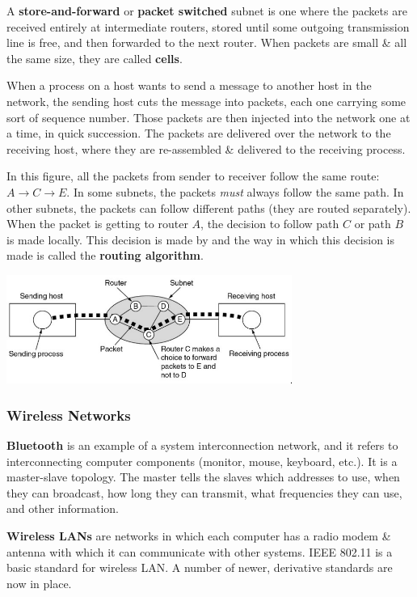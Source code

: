 \documentclass[11pt]{article}
\begin{document}
A \textbf{store-and-forward} or \textbf{packet switched} subnet is one where the packets are received entirely at intermediate 
routers, stored until some outgoing transmission line is free, and then forwarded to the next router. 
When packets are small \& all the same size, they are called \textbf{cells}. 

When a process on a host wants to send a message to another host in the network, the sending host cuts the message into packets,
each one carrying some sort of sequence number. 
Those packets are then injected into the network one at a time, in quick succession. 
The packets are delivered over the network to the receiving host, where they are re-assembled \& delivered to the receiving process. 

In this figure, all the packets from sender to receiver follow the same route: $ A \rightarrow C \rightarrow E $.
In some subnets, the packets \textit{must} always follow the same path. 
In other subnets, the packets can follow different paths (they are routed separately). 
When the packet is getting to router $A$, the decision to follow path $C$ or path $B$ is made locally. 
This decision is made by and the way in which this decision is made is called the \textbf{routing algorithm}.

\begin{center}
    \includegraphics[width=0.7\textwidth]{wan-diagram-2.png}
\end{center}

\subsubsection{Wireless Networks}
\textbf{Bluetooth} is an example of a system interconnection network, and it refers to interconnecting computer components 
(monitor, mouse, keyboard, etc.). 
It is a master-slave topology. 
The master tells the slaves which addresses to use, when they can broadcast, how long they can transmit, what frequencies they 
can use, and other information.

\textbf{Wireless LANs} are networks in which each computer has a radio modem \& antenna with which it can communicate with other
systems. 
IEEE 802.11 is a basic standard for wireless LAN. 
A number of newer, derivative standards are now in place. 
\end{document}
